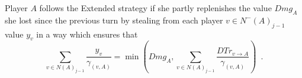 \begin{definition}
  \label{extendedstrategy}
  Player $A$ follows the Extended strategy if she partly replenishes the value $Dmg_A$ she lost since the previous turn by
  stealing from each player $v \in N^{-}\left(A\right)_{j-1}$ value $y_v$\emph{\bitcoin} in a way which ensures that
  \begin{equation}
    \label{extendedstrategyequation}
    \sum\limits_{v \in N\left(A\right)_{j-1}}\frac{y_v}{\gamma_{\left(v, A\right)}} = \min{\left(Dmg_A, \sum\limits_{v \in
    N\left(A\right)_{j-1}}\frac{DTr_{v \rightarrow A}}{\gamma_{\left(v, A\right)}}\right)} \enspace.
  \end{equation}
\end{definition}
